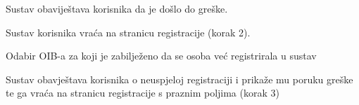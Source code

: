 \begin{packed_item}
\begin{packed_item}
\begin{packed_enum}
								\item Sustav obaviještava korisnika da je došlo do greške.
								\item Sustav korisnika vraća na stranicu registracije (korak 2).
							\end{packed_enum}
							
							\item[5.a] Odabir OIB-a za koji je zabilježeno da se osoba već registrirala u sustav
							\item[] \begin{packed_enum}
								
								\item Sustav obavještava korisnika o neuspjeloj registraciji i prikaže mu poruku greške te ga vraća na stranicu registracije s praznim poljima (korak 3)
								
								
							\end{packed_enum}
							
							
						\end{packed_item}
					\end{packed_item}
					
